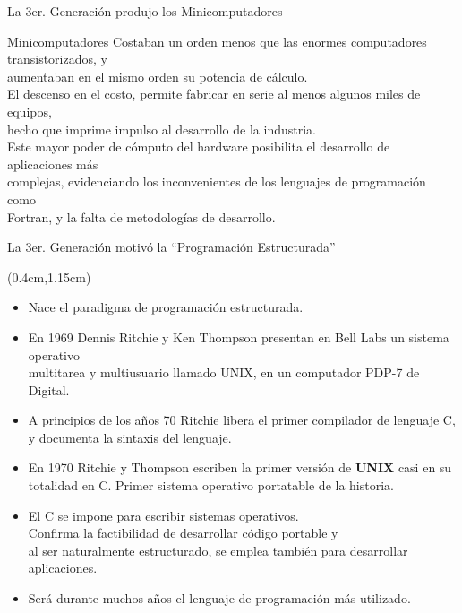 \documentclass[table,dvipsnames,aspectratio=169]{beamer}
\begin{document}
\begin{frame}{La 3er. Generación produjo los Minicomputadores}
\begin{block}{Minicomputadores}
\justifying
\textcolor{furfiBlue}{Costaban un orden menos que las enormes computadores transistorizados, y\\
aumentaban en el mismo orden su potencia de cálculo.}\\
\bigskip
El descenso en el costo, permite fabricar en serie al menos algunos \textcolor{furfiBlue}{miles de equipos},\\
hecho que imprime \textcolor{furfiGreen}{impulso al desarrollo de la industria}.\\
\bigskip
Este mayor poder de cómputo del hardware posibilita el desarrollo de aplicaciones más\\
complejas, evidenciando los \textcolor{furfiBlue}{inconvenientes de los lenguajes de programación} como\\
Fortran, y la falta de metodologías de desarrollo.
\end{block}
\end{frame}

\begin{frame}{La 3er. Generación motivó la ``Programación Estructurada''}
 \begin{textblock*}{\textwidth}(0.4cm,1.15cm)
  \begin{itemize}[<+(1)->]\justifying \parskip 0.2cm
   \item Nace el paradigma de \textcolor{furfiBlue}{programación estructurada}.
   \item En 1969 Dennis Ritchie y Ken Thompson presentan en Bell Labs un sistema operativo\\
   multitarea y multiusuario llamado UNIX, en un computador PDP-7 de Digital.
   \item A principios de los años 70 Ritchie libera el primer compilador de lenguaje C,\\
   y documenta la sintaxis del lenguaje.
   \item En 1970 Ritchie y Thompson escriben la primer versión de \textbf{UNIX} casi en su\\
   totalidad en C. \textcolor{furfiBlue}{Primer sistema operativo portatable de la historia}.
   \item El C se impone para escribir sistemas operativos.\\
   Confirma la factibilidad de desarrollar \textcolor{furfiBlue}{código portable} y\\
   al ser naturalmente estructurado, se emplea también para desarrollar aplicaciones.
   \item \textcolor{furfiGreen}{Será durante muchos años el lenguaje de programación más utilizado.}
  \end{itemize}
 \end{textblock*}
\end{frame}
\end{document}

